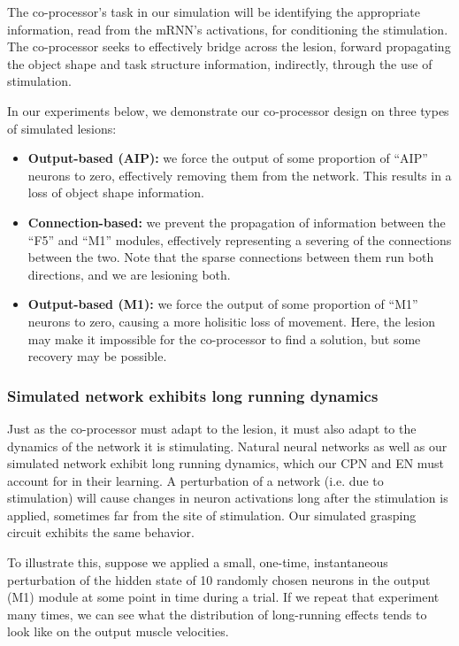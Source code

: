 \documentclass[12pt]{iopart}
\begin{document}
The co-processor's task in our simulation will be identifying the appropriate information,
read from the mRNN's activations, for conditioning the stimulation. The co-processor seeks
to effectively bridge across the lesion, forward propagating the object shape and task
structure information, indirectly, through the use of stimulation.

In our experiments below, we demonstrate our co-processor design on three types of
simulated lesions:
\begin{itemize}
	\item \textbf{Output-based (AIP):} we force the output of some proportion of ``AIP''
	      neurons to zero, effectively removing them from the network. This results in a
	      loss of object shape information.
	\item \textbf{Connection-based:} we prevent the propagation of
	      information between the ``F5'' and ``M1'' modules, effectively representing a
	      severing of the connections between the two. Note that the sparse connections
	      between them run both directions, and we are lesioning both.
	\item \textbf{Output-based (M1):} we force the output of some proportion of ``M1''
	      neurons to zero, causing a more holisitic loss of movement. Here, the lesion
	      may make it impossible for the co-processor to find a solution, but some
	      recovery may be possible.
\end{itemize}

\subsubsection{Simulated network exhibits long running dynamics}
Just as the co-processor must adapt to the lesion, it must also adapt to the dynamics of
the network it is stimulating. Natural neural networks as well as our simulated network
exhibit long running dynamics, which our CPN and EN must account for in their learning.
A perturbation of a network (i.e. due to stimulation) will cause changes in neuron
activations long after the stimulation is applied, sometimes far from the site of
stimulation. Our simulated grasping circuit exhibits the same behavior.

To illustrate this, suppose we applied a small, one-time, instantaneous perturbation
of the hidden state of 10 randomly chosen neurons in the output (M1) module at some point
in time during a trial. If we repeat that experiment many times, we can see what the
distribution of long-running effects tends to look like on the output muscle velocities.
\end{document}
